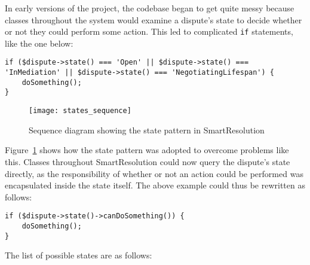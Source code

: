 In early versions of the project, the codebase began to get quite messy because classes throughout the system would examine a dispute's state to decide whether or not they could perform some action. This led to complicated \lstinline{if} statements, like the one below:

\begin{lstlisting}
if ($dispute->state() === 'Open' || $dispute->state() === 'InMediation' || $dispute->state() === 'NegotiatingLifespan') {
    doSomething();
}
\end{lstlisting}

\begin{figure}[h!]
  \centering
    \ifimages
    \texttt{[image: states\_sequence]}
    \fi
  \caption{Sequence diagram showing the state pattern in SmartResolution}
  \label{uml:states}
\end{figure}

Figure~\ref{uml:states} shows how the state pattern was adopted to overcome problems like this. Classes throughout SmartResolution could now query the dispute's state directly, as the responsibility of whether or not an action could be performed was encapsulated inside the state itself. The above example could thus be rewritten as follows:

\begin{lstlisting}
if ($dispute->state()->canDoSomething()) {
    doSomething();
}
\end{lstlisting}

The list of possible states are as follows:

